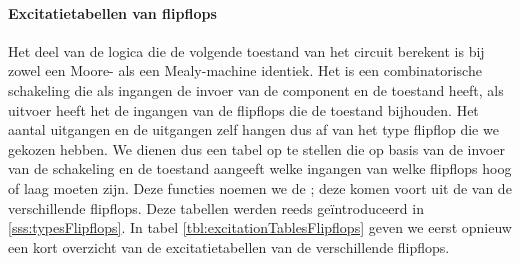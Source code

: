 \paragraph{Excitatietabellen van flipflops}Het deel van de logica die de volgende toestand van het circuit berekent is bij zowel een Moore- als een Mealy-machine identiek. Het is een combinatorische schakeling die als ingangen de invoer van de component en de toestand heeft, als uitvoer heeft het de ingangen van de flipflops die de toestand bijhouden. Het aantal uitgangen en de uitgangen zelf hangen dus af van het type flipflop die we gekozen hebben. We dienen dus een tabel op te stellen die op basis van de invoer van de schakeling en de toestand aangeeft welke ingangen van welke flipflops hoog of laag moeten zijn. Deze functies noemen we de ; deze komen voort uit de  van de verschillende flipflops. Deze tabellen werden reeds ge\"introduceerd in \ref{sss:typesFlipflops}. In tabel \ref{tbl:excitationTablesFlipflops} geven we eerst opnieuw een kort overzicht van de excitatietabellen van de verschillende flipflops.
\begin{table}[hbt]
\centering
{}
\caption{Excitatietabellen van de verschillende flipflops}
\end{table}
